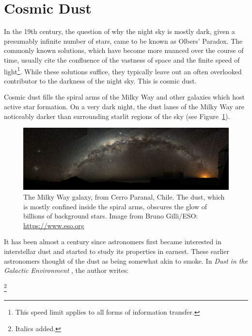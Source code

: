 \section{Cosmic Dust}

In the 19th century, the question of why the night sky is mostly dark, given a presumably infinite number of stars, came to be known as Olbers' Paradox. The commonly known solutions, which have become more nuanced over the course of time, usually cite the confluence of the vastness of space and the finite speed of light\footnote{This speed limit applies to all forms of information transfer.}. While these solutions suffice, they typically leave out an often overlooked contributor to the darkness of the night sky. This is cosmic dust.

Cosmic dust fills the spiral arms of the Milky Way and other galaxies which host active star formation. On a very dark night, the dust lanes of the Milky Way are noticeably darker than surrounding starlit regions of the sky (see Figure~\ref{fig:MW}).

\begin{figure}[!htbp]
\centering
\includegraphics[width=\textwidth]{figures/intro/Milky_Way_Arch}
\caption[~The dust lane of the Milky Way galaxy.]{The Milky Way galaxy, from Cerro Paranal, Chile. The dust, which is mostly confined inside the spiral arms, obscures the glow of billions of background stars. Image from Bruno Gilli/ESO: \url{https://www.eso.org}}
\label{fig:MW}
\end{figure}

It has been almost a century since astronomers first became interested in interstellar dust and started to study its properties in earnest. These earlier astronomers thought of the dust as being somewhat akin to smoke. In \textit{Dust in the Galactic Environment} \citep{whittet2002dust}, the author writes:

\footnote{Italics added.}

